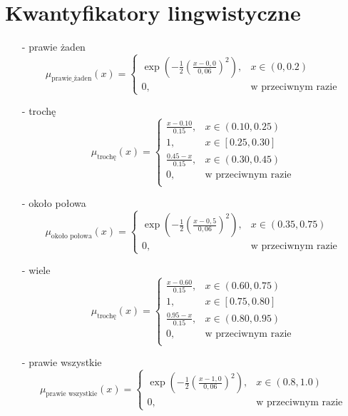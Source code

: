 \documentclass{article}
\begin{document}
\section{Kwantyfikatory lingwistyczne}
    \begin{itemize}
    \item[-] prawie żaden
        \begin{equation}
            \mu_{\text{prawie\_żaden}}(x) =
        \begin{cases}
        \exp\left( -\frac{1}{2} \left( \frac{x - 0{,}0}{0,06} \right)^2 \right), & x \in (0, 0.2) \\
        0, & \text{w przeciwnym razie}
        \end{cases}
        \end{equation}
    \item[-] trochę
        \begin{equation}
            \mu_{\text{trochę}}(x) =
            \begin{cases}
            \frac{x - 0.10}{0.15}, & x \in (0.10, 0.25) \\
            1, & x \in [0.25, 0.30] \\
            \frac{0.45 - x}{0.15}, & x \in (0.30, 0.45)\\
            0, & \text{w przeciwnym razie} \\
            \end{cases}
        \end{equation}
    \item[-] około połowa
        \begin{equation}
        \mu_{\text{około połowa}}(x) =
        \begin{cases}
        \exp\left( -\frac{1}{2} \left( \frac{x - 0{,}5}{0,06} \right)^2 \right), & x \in (0.35, 0.75) \\
        0, & \text{w przeciwnym razie}
\end{cases}
        \end{equation}
    \item[-] wiele
        \begin{equation}
             \mu_{\text{trochę}}(x) =
            \begin{cases}
            \frac{x - 0.60}{0.15}, & x \in (0.60, 0.75) \\
            1, & x \in [0.75, 0.80] \\
            \frac{0.95 - x}{0.15}, & x \in (0.80, 0.95)\\
            0, & \text{w przeciwnym razie} \\
            \end{cases}
        \end{equation}
    \item[-] prawie wszystkie
        \begin{equation}
            \mu_{\text{prawie wszystkie}}(x) =
            \begin{cases}
            \exp\left( -\frac{1}{2} \left( \frac{x - 1{,}0}{0,06} \right)^2 \right), &  x \in (0.8, 1.0) \\
            0, & \text{w przeciwnym razie}
            \end{cases}
        \end{equation}
\end{itemize}
\end{document}
